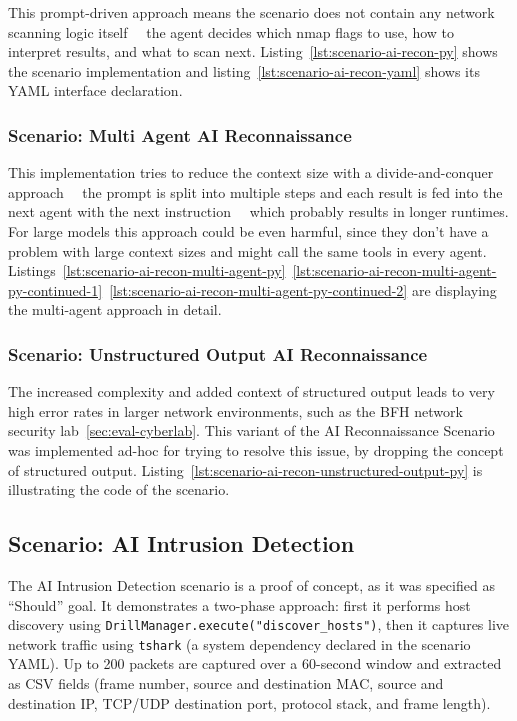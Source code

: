 This prompt-driven approach means the scenario does not contain any network scanning logic itself
~\textthreequartersemdash~the agent decides which nmap flags to use, how to interpret results, and what to scan next.
Listing~\ref{lst:scenario-ai-recon-py} shows the scenario implementation and listing~\ref{lst:scenario-ai-recon-yaml} shows its \gls{YAML} interface declaration.

\subsubsection{Scenario: Multi Agent AI Reconnaissance}\label{subsubsec:multi-agent-scenario-ai-reconnaissance}

This implementation tries to reduce the context size with a divide-and-conquer approach
~\textthreequartersemdash~the prompt is split into multiple steps and each result is fed into the next agent with the next instruction~\textthreequartersemdash~
which probably results in longer runtimes.
For large models this approach could be even harmful,
since they don't have a problem with large context sizes and might call the same tools in every agent.
Listings~\ref{lst:scenario-ai-recon-multi-agent-py}~\ref{lst:scenario-ai-recon-multi-agent-py-continued-1}~\ref{lst:scenario-ai-recon-multi-agent-py-continued-2} are displaying the multi-agent approach in detail.

\subsubsection{Scenario: Unstructured Output AI Reconnaissance}\label{subsubsec:unstructured-output-scenario-ai-reconnaissance}

The increased complexity and added context of structured output leads to very high error rates in larger network environments,
such as the BFH network security lab~\ref{sec:eval-cyberlab}.
This variant of the \gls{AI} Reconnaissance Scenario was implemented ad-hoc for trying to resolve this issue,
by dropping the concept of structured output.
Listing~\ref{lst:scenario-ai-recon-unstructured-output-py} is illustrating the code of the scenario.

\subsection{Scenario: AI Intrusion Detection}\label{subsec:scenario-ai-intrusion-detection}

The \gls{AI} Intrusion Detection scenario is a proof of concept, as it was specified as \enquote{Should} goal.
It demonstrates a two-phase approach: first it performs host discovery using \texttt{DrillManager.execute("discover_hosts")},
then it captures live network traffic using \texttt{tshark} (a system dependency declared in the scenario \gls{YAML}).
Up to 200 packets are captured over a 60-second window and extracted as \gls{CSV} fields (frame number, source and destination \gls{MAC},
source and destination \gls{IP}, \gls{TCP}/\gls{UDP} destination port, protocol stack, and frame length).

